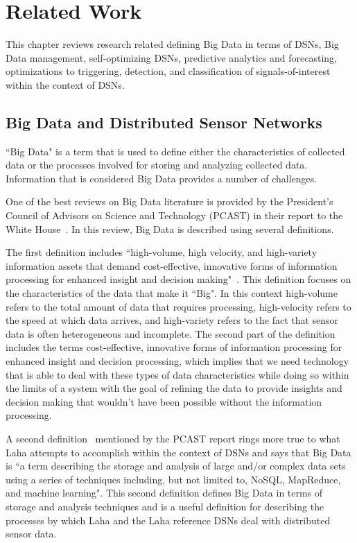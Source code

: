 \chapter{Related Work}\label{ch:related-work}
This chapter reviews research related defining Big Data in terms of DSNs, Big Data management, self-optimizing DSNs, predictive analytics and forecasting, optimizations to triggering, detection, and classification of signals-of-interest within the context of DSNs.

\section{Big Data and Distributed Sensor Networks}\label{sec:big-data-and-distributed-sensor-networks}
``Big Data" is a term that is used to define either the characteristics of collected data or the processes involved for storing and analyzing collected data. Information that is considered Big Data provides a number of challenges.

One of the best reviews on Big Data literature is provided by the President's Council of Advisors on Science and Technology (PCAST) in their report to the White House~\cite{house2014big}. In this review, Big Data is described using several definitions.

The first definition includes ``high-volume, high velocity, and high-variety information assets that demand cost-effective, innovative forms of information processing for enhanced insight and decision making"~\cite{gartner_it_glossary_2016}. This definition focuses on the characteristics of the data that make it ``Big". In this context high-volume refers to the total amount of data that requires processing, high-velocity refers to the speed at which data arrives, and high-variety refers to the fact that sensor data is often heterogeneous and incomplete. The second part of the definition includes the terms cost-effective, innovative forms of information processing for enhanced insight and decision processing, which implies that we need technology that is able to deal with these types of data characteristics while doing so within the limits of a system with the goal of refining the data to provide insights and decision making that wouldn't have been possible without the information processing.

A second definition~\cite{ward2013undefined} mentioned by the PCAST report rings more true to what Laha attempts to accomplish within the context of DSNs and says that Big Data is ``a term describing the storage and analysis of large and/or complex data sets using a series of techniques including, but not limited to, NoSQL, MapReduce, and machine learning". This second definition defines Big Data in terms of storage and analysis techniques and is a useful definition for describing the processes by which Laha and the Laha reference DSNs deal with distributed sensor data.

